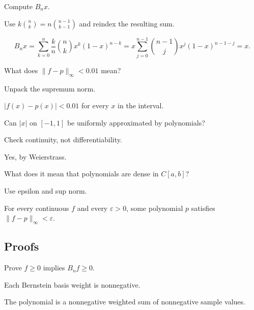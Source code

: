 \begin{exercise}\label{exr:ii21-expand-02}
Compute \(B_nx\).
\end{exercise}
\begin{hint}
Use \(k\binom nk=n\binom{n-1}{k-1}\) and reindex the resulting sum.
\end{hint}
\begin{solution}
\[
B_nx
=\sum_{k=0}^n\frac{k}{n}\binom nkx^k(1-x)^{n-k}
=x\sum_{j=0}^{n-1}\binom{n-1}{j}x^j(1-x)^{n-1-j}
=x.
\]
\end{solution}

\begin{exercise}\label{exr:ii21-expand-03}
What does \(\|f-p\|_\infty<0.01\) mean?
\end{exercise}
\begin{hint}
Unpack the supremum norm.
\end{hint}
\begin{solution}
\(|f(x)-p(x)|<0.01\) for every \(x\) in the interval.
\end{solution}

\begin{exercise}\label{exr:ii21-expand-04}
Can \(|x|\) on \([-1,1]\) be uniformly approximated by polynomials?
\end{exercise}
\begin{hint}
Check continuity, not differentiability.
\end{hint}
\begin{solution}
Yes, by Weierstrass.
\end{solution}

\begin{exercise}\label{exr:ii21-expand-05}
What does it mean that polynomials are dense in \(C[a,b]\)?
\end{exercise}
\begin{hint}
Use epsilon and sup norm.
\end{hint}
\begin{solution}
For every continuous \(f\) and every \(\varepsilon>0\), some polynomial \(p\) satisfies \(\|f-p\|_\infty<\varepsilon\).
\end{solution}

\subsection*{Proofs}

\begin{exercise}\label{exr:ii21-expand-06}
Prove \(f\ge0\) implies \(B_nf\ge0\).
\end{exercise}
\begin{hint}
Each Bernstein basis weight is nonnegative.
\end{hint}
\begin{solution}
The polynomial is a nonnegative weighted sum of nonnegative sample values.
\end{solution}

